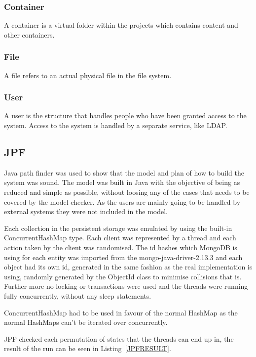 \documentclass[a4paper,12pt]{article}
\begin{document}
\subsubsection{Container}
A container is a virtual folder within the projects which contains content and other containers.

\subsubsection{File}
A file refers to an actual physical file in the file system.

\subsubsection{User}
A user is the structure that handles people who have been granted access to the system.
Access to the system is handled by a separate service, like LDAP.

\subsection{JPF}
Java path finder was used to show that the model and plan of how to build the system was sound. The model was built in Java 
with the objective of being as reduced and simple as possible, without loosing any of the cases that needs to be covered 
by the model checker. As the users are mainly going to be handled by external systems they were not included in the model.

Each collection in the persistent storage was emulated by using the built-in ConcurrentHashMap type. 
Each client was represented by a thread and each action taken by the client was randomised. The id hashes which MongoDB is 
using for each entity was imported from the mongo-java-driver-2.13.3 and each object had its own id, generated in the same 
fashion as the real implementation is using, randomly generated by the ObjectId class to minimise collisions that is. 
Further more no locking or transactions were used and the threads were running fully concurrently, without any sleep statements. 

ConcurrentHashMap had to be used in favour of the normal HashMap as the normal HashMaps can't be iterated over concurrently.

JPF checked each permutation of states that the threads can end up in, the result of the run can be seen in Listing~\ref{JPFRESULT}.
\end{document}

